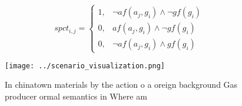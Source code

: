 \documentclass[a4paper]{article}
\begin{document}
\begin{equation}
spct_{i,j} =
\begin{cases}
1, & \text{$\neg af(a_j,g_i) \wedge \neg gf(g_i)$}\\
0, & \text{$af(a_j,g_i) \wedge \neg gf(g_i)$}\\
0, & \text{$\neg af(a_j,g_i) \wedge gf(g_i)$}
\end{cases}
\end{equation}

\begin{figure}
\centering
\texttt{[image: ../scenario\_visualization.png]}
\caption{In chinatown materials by the action o a oreign background Gas producer ormal semantics in Where am
}
\end{figure}
 
\end{document}
